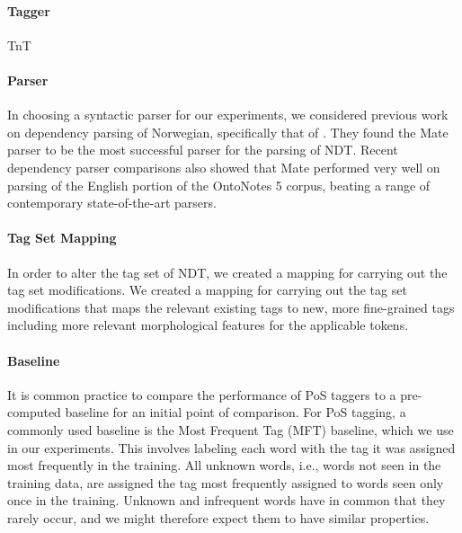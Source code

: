 \documentclass[11pt]{article}
\begin{document}
\paragraph{Tagger}
TnT \cite{Bra:00}

\paragraph{Parser}
In choosing a syntactic parser for our experiments, we considered previous work
on dependency parsing of Norwegian, specifically that of \cite{Sol:Skj:Ovr:14}.
They found the Mate parser \cite{Boh:10} to be the most successful parser for
the parsing of NDT. Recent dependency parser comparisons \cite{Cho:Tet:Ste:15}
also showed that Mate performed very well on parsing of the English portion of
the OntoNotes 5 corpus, beating a range of contemporary state-of-the-art
parsers.

\paragraph{Tag Set Mapping}
In order to alter the tag set of NDT, we created a mapping for carrying out the
tag set modifications. We created a mapping for carrying out the tag set
modifications that maps the relevant existing tags to new, more fine-grained
tags including more relevant morphological features for the applicable tokens.

\paragraph{Baseline}
It is common practice to compare the performance of PoS taggers to a
pre-computed baseline for an initial point of comparison.
For PoS tagging, a commonly used baseline is the Most Frequent Tag (MFT)
baseline, which we use in our experiments. This involves labeling each word
with the tag it was assigned most frequently in the training. All unknown
words, i.e., words not seen in the training data, are assigned the tag most
frequently assigned to words seen only once in the training. Unknown and
infrequent words have in common that they rarely occur, and we might therefore
expect them to have similar properties.
\end{document}
